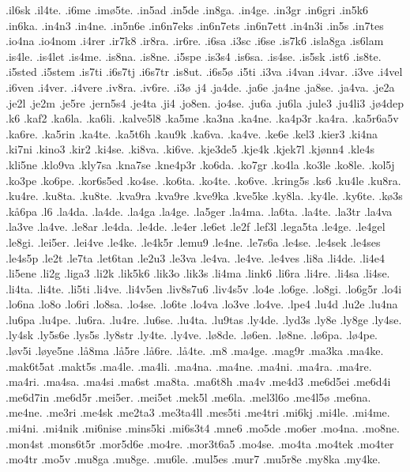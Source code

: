 {.il6sk
.il4te.
.i6me
.im^^f85te.
.in5ad
.in5de
.in8ga.
.in4ge.
.in3gr
.in6gri
.in5k6
.in6ka.
.in4n3
.in4ne.
.in5n6e
.in6n7eks
.in6n7ets
.in6n7ett
.in4n3i
.in5s
.in7tes
.io4na
.io4nom
.i4rer
.ir7k8
.ir8ra.
.ir6re.
.i6sa
.i3sc
.i6se
.is7k6
.isla8ga
.is6lam
.is4le.
.is4let
.is4me.
.is8na.
.is8ne.
.i5spe
.is3s4
.is6sa.
.is4se.
.is5sk
.ist6
.is8te.
.i5sted
.i5stem
.is7ti
.i6s7tj
.i6s7tr
.is8ut.
.i6s5^^f8
.i5ti
.i3va
.i4van
.i4var.
.i3ve
.i4vel
.i6ven
.i4ver.
.i4vere
.iv8ra.
.iv6re.
.i3^^f8
.j4
.ja4de.
.ja6e
.ja4ne
.ja8se.
.ja4va.
.je2a
.je2l
.je2m
.je5re
.jern5s4
.je4ta
.ji4
.jo8en.
.jo4se.
.ju6a
.ju6la
.jule3
.ju4li3
.j^^f84dep
.k6
.kaf2
.ka6la.
.ka6li.
.kalve5l8
.ka5me
.ka3na
.ka4ne.
.ka4p3r
.ka4ra.
.ka5r6a5v
.ka6re.
.ka5rin
.ka4te.
.ka5t6h
.kau9k
.ka6va.
.ka4ve.
.ke6e
.kel3
.kier3
.ki4na
.ki7ni
.kino3
.kir2
.ki4se.
.ki8va.
.ki6ve.
.kje3de5
.kje4k
.kjek7l
.kj^^f8nn4
.kle4s
.kli5ne
.klo9va
.kly7sa
.kna7se
.kne4p3r
.ko6da.
.ko7gr
.ko4la
.ko3le
.ko8le.
.kol5j
.ko3pe
.ko6pe.
.kor6s5ed
.ko4se.
.ko6ta.
.ko4te.
.ko6ve.
.kring5s
.ks6
.ku4le
.ku8ra.
.ku4re.
.ku8ta.
.ku8te.
.kva9ra
.kva9re
.kve9ka
.kve5ke
.ky8la.
.ky4le.
.ky6te.
.k^^f83s
.k^^e56pa
.l6
.la4da.
.la4de.
.la4ga
.la4ge.
.la5ger
.la4ma.
.la6ta.
.la4te.
.la3tr
.la4va
.la3ve
.la4ve.
.le8ar
.le4da.
.le4de.
.le4er
.le6et
.le2f
.lef3l
.lega5ta
.le4ge.
.le4gel
.le8gi.
.lei5er.
.lei4ve
.le4ke.
.le4k5r
.lemu9
.le4ne.
.le7s6a
.le4se.
.le4sek
.le4ses
.le4s5p
.le2t
.le7ta
.let6tan
.le2u3
.le3va
.le4va.
.le4ve.
.le4ves
.li8a
.li4de.
.li4e4
.li5ene
.li2g
.liga3
.li2k
.lik5k6
.lik3o
.lik3s
.li4ma
.link6
.li6ra
.li4re.
.li4sa
.li4se.
.li4ta.
.li4te.
.li5ti
.li4ve.
.li4v5en
.liv8s7u6
.liv4s5v
.lo4e
.lo6ge.
.lo8gi.
.lo6g5r
.lo4i
.lo6na
.lo8o
.lo6ri
.lo8sa.
.lo4se.
.lo6te
.lo4va
.lo3ve
.lo4ve.
.lpe4
.lu4d
.lu2e
.lu4na
.lu6pa
.lu4pe.
.lu6ra.
.lu4re.
.lu6se.
.lu4ta.
.lu9tas
.ly4de.
.lyd3s
.ly8e
.ly8ge
.ly4se.
.ly4sk
.ly5s6e
.lys5s
.ly8str
.ly4te.
.ly4ve.
.l^^f88de.
.l^^f86en.
.l^^f88ne.
.l^^f86pa.
.l^^f84pe.
.l^^f8v5i
.l^^f8ye5ne
.l^^e58ma
.l^^e55re
.l^^e56re.
.l^^e54te.
.m8
.ma4ge.
.mag9r
.ma3ka
.ma4ke.
.mak6t5at
.makt5s
.ma4le.
.ma4li.
.ma4na.
.ma4ne.
.ma4ni.
.ma4ra.
.ma4re.
.ma4ri.
.ma4sa.
.ma4si
.ma6st
.ma8ta.
.ma6t8h
.ma4v
.me4d3
.me6d5ei
.me6d4i
.me6d7in
.me6d5r
.mei5er.
.mei5et
.mek5l
.me6la.
.mel3l6o
.me4l5^^f8
.me6na.
.me4ne.
.me3ri
.me4sk
.me2ta3
.me3ta4ll
.mes5ti
.me4tri
.mi6kj
.mi4le.
.mi4me.
.mi4ni.
.mi4nik
.mi6nise
.mins5ki
.mi6s3t4
.mne6
.mo5de
.mo6er
.mo4na.
.mo8ne.
.mon4st
.mons6t5r 
.mor5d6e
.mo4re.
.mor3t6a5
.mo4se.
.mo4ta
.mo4tek
.mo4ter
.mo4tr
.mo5v
.mu8ga
.mu8ge.
.mu6le.
.mul5es
.mur7
.mu5r8e
.my8ka
.my4ke.
}
